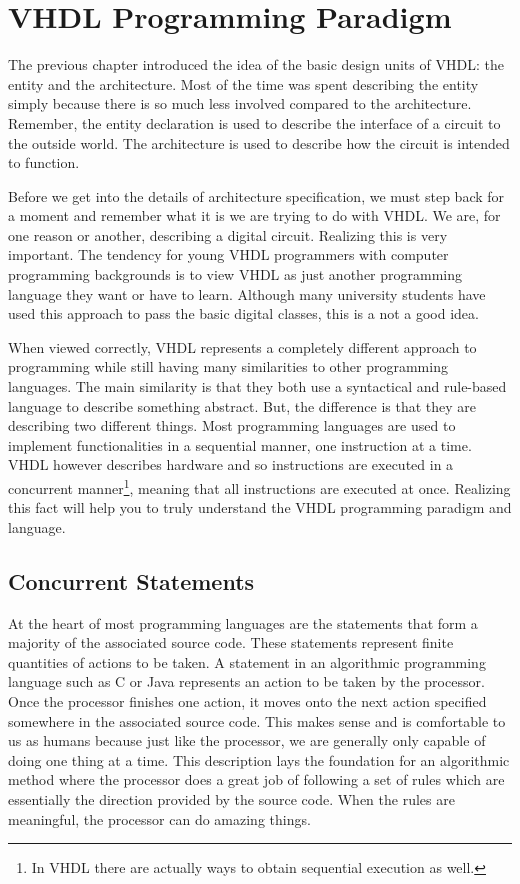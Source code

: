 %
%
\chapter{VHDL Programming Paradigm}
The previous chapter introduced the idea of the basic design units of VHDL: the entity and the architecture. Most of the time was spent describing the entity simply because there is so much less involved compared to the architecture. Remember, the entity declaration is used to describe the interface of a circuit to the outside world. The architecture is used to describe how the circuit is intended to function.

Before we get into the details of architecture specification, we must step back for a moment and remember what it is we are trying to do with VHDL. We are, for one reason or another, describing a digital circuit. Realizing this is very important. The tendency for young VHDL programmers with computer programming backgrounds is to view VHDL as just another programming language they want or have to learn. Although many university students have used this approach to pass the basic digital classes, this is a not a good idea. 

When viewed correctly, VHDL represents a completely different approach to programming while still having many similarities to other programming languages. The main similarity is that they both use a syntactical and rule-based language to describe something abstract. But, the difference is that they are describing two different things. Most programming languages are used to implement functionalities in a sequential manner, one instruction at a time. VHDL however describes hardware and so instructions are executed in a concurrent manner\footnote{In VHDL there are actually ways to obtain sequential execution as well.}, meaning that all instructions are executed at once. Realizing this fact will help you to truly understand the VHDL programming paradigm and language.

\section{Concurrent Statements}
At the heart of most programming languages are the statements that form a majority of the associated source code. These statements represent finite quantities of actions to be taken. A statement in an algorithmic programming language such as C or Java represents an action to be taken by the processor. Once the processor finishes one action, it moves onto the next action specified somewhere in the associated source code. This makes sense and is comfortable to us as humans because just like the processor, we are generally only capable of doing one thing at a time. This description lays the foundation for an algorithmic method where the processor does a great job of following a set of rules which are essentially the direction provided by the source code. When the rules are meaningful, the processor can do amazing things. 

